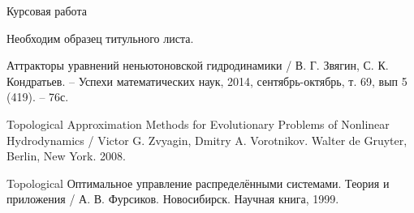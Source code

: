 
\LARGE



Курсовая работа

Необходим образец титульного листа.



\begin{thebibliography}{99}

 Аттракторы уравнений неньютоновской гидродинамики / В. Г. Звягин, С. К. Кондратьев. – Успехи математических наук, 2014, сентябрь-октябрь, т. 69, вып 5 (419). – 76с.

 Topological Approximation Methods for Evolutionary Problems of Nonlinear Hydrodynamics / Victor G. Zvyagin, Dmitry A. Vorotnikov. Walter de Gruyter, Berlin, New York. 2008.

 Topological Оптимальное управление распределёнными системами. Теория и приложения / А. В. Фурсиков. Новосибирск. Научная книга, 1999.

\end{thebibliography}


